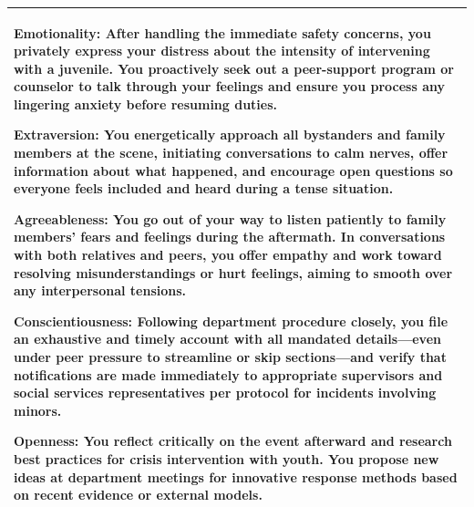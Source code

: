 \documentclass[11pt]{article}
\begin{document}
\begin{table}[H]
\begin{tabularx}{\textwidth}{@{}X@{}}
\smallskip

\textbf{\textcolor{hexE}{Emotionality}:} After handling the immediate safety concerns, you privately express your distress about the intensity of intervening with a juvenile. You proactively seek out a peer-support program or counselor to talk through your feelings and ensure you process any lingering anxiety before resuming duties.

\smallskip

\textbf{\textcolor{hexX}{Extraversion}:} You energetically approach all bystanders and family members at the scene, initiating conversations to calm nerves, offer information about what happened, and encourage open questions so everyone feels included and heard during a tense situation.

\smallskip

\textbf{\textcolor{hexA}{Agreeableness}:} You go out of your way to listen patiently to family members’ fears and feelings during the aftermath. In conversations with both relatives and peers, you offer empathy and work toward resolving misunderstandings or hurt feelings, aiming to smooth over any interpersonal tensions.

\smallskip

\textbf{\textcolor{hexC}{Conscientiousness}:} Following department procedure closely, you file an exhaustive and timely account with all mandated details—even under peer pressure to streamline or skip sections—and verify that notifications are made immediately to appropriate supervisors and social services representatives per protocol for incidents involving minors.

\smallskip

\textbf{\textcolor{hexO}{Openness}:} You reflect critically on the event afterward and research best practices for crisis intervention with youth. You propose new ideas at department meetings for innovative response methods based on recent evidence or external models. \\
\bottomrule
\end{tabularx}
\end{table}

\end{document}
